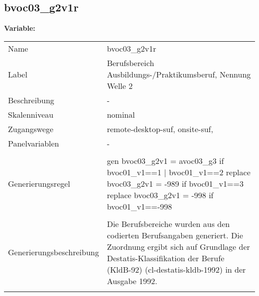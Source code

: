 	
	
	\subsection{bvoc03\_g2v1r}
	\label{subSection:bvoc03_g2v1r}

	\noindent\textbf{Variable:}\\
		\begin{tabular}{lL{11.3cm}}
			\label{tableVariable:bvoc03_g2v1r}
			Name & bvoc03\_g2v1r \\
			Label & Berufsbereich Ausbildungs-/Praktikumsberuf, Nennung Welle 2 \\
			Beschreibung & - \\
			Skalenniveau & nominal \\
			Zugangswege &
				remote-desktop-suf,
				onsite-suf,
 \\
			Panelvariablen & -
			 \\
			 \\
					Generierungsregel & gen bvoc03\_g2v1 = avoc03\_g3 if bvoc01\_v1==1 | bvoc01\_v1==2
replace bvoc03\_g2v1 = -989 if bvoc01\_v1==3
replace bvoc03\_g2v1 = -998 if bvoc01\_v1==-998 \\
				 \\
					Generierungsbeschreibung & Die Berufsbereiche wurden aus den codierten Berufsangaben generiert. Die Zuordnung ergibt sich auf Grundlage der Destatis-Klassifikation der Berufe (KldB-92) (cl-destatis-kldb-1992) in der Ausgabe 1992. 
				 \\	
			 \\
		\end{tabular}






